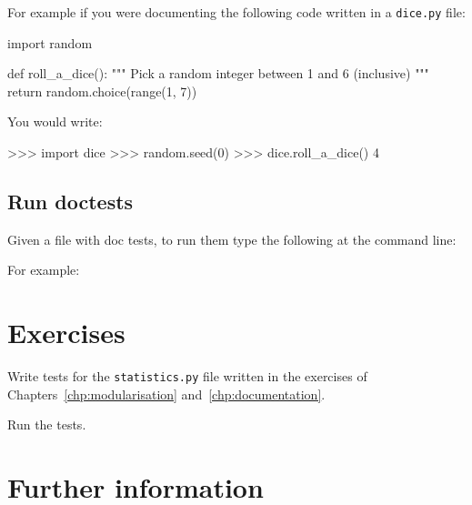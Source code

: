 For example if you were documenting the following code written in a \texttt{dice.py}
file:

\begin{python}
import random


def roll_a_dice():
    """
    Pick a random integer between 1 and 6 (inclusive)
    """
    return random.choice(range(1, 7))
\end{python}


You would write:

\begin{md}
>>> import dice
>>> random.seed(0)
>>> dice.roll_a_dice()
4

\end{md}


\subsection{Run doctests}
\label{\detokenize{building-tools/07-testing/how/main:how-to-run-doctests}}

Given a file with doc tests, to run them type the following at the
command line:





For example:





\section{Exercises}
\label{\detokenize{building-tools/07-testing/exercises/main:exercises}}\label{\detokenize{building-tools/07-testing/exercises/main::doc}}

Write tests for the \texttt{statistics.py} file written in the exercises of
Chapters~\ref{chp:modularisation} and~\ref{chp:documentation}.


Run the tests.



\section{Further information}
\label{\detokenize{building-tools/07-testing/why/main:further-information}}\label{\detokenize{building-tools/07-testing/why/main::doc}}

